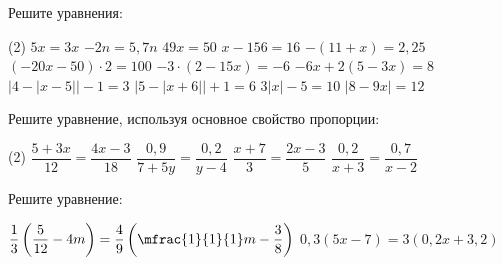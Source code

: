 \begin{homework}[number=1]
	\begin{listofex}
		\item Решите уравнения: %
		\begin{tasks}(2)
			\task \( 5x=3x \)
			\task \( -2n=5,7n \)
			\task \( 49x=50 \)
			\task \( x-156=16 \)
			\task \( -(11+x)=2,25 \)
			\task \( (-20x-50)\cdot 2 = 100 \)
			\task \( -3 \cdot (2-15x) = -6 \)
			\task \( -6x+2(5-3x)=8 \)
			\task \( |4-|x-5||-1=3 \)
			\task \( |5-|x+6||+1=6 \)
			\task \( 3|x|-5=10 \)
			\task \( |8-9x|=12 \)
		\end{tasks}
		\item Решите уравнение, используя основное свойство пропорции:
		\begin{tasks}(2)
			\task \( \dfrac{5+3x}{12} = \dfrac{4x-3}{18} \)
			\task \( \dfrac{0,9}{7+5y} = \dfrac{0,2}{y-4} \)
			\task \( \dfrac{x+7}{3} = \dfrac{2x-3}{5} \)
			\task \( \dfrac{0,2}{x+3} = \dfrac{0,7}{x-2} \)
		\end{tasks}
		\item Решите уравнение: %
		\begin{tasks}
			\task \( \dfrac{1}{3} \left( \dfrac{5}{12}-4m \right) =\dfrac{4}{9} \left(  \mfrac{1}{1}{1} m-\dfrac{3}{8} \right) \)
			\task \( 0,3(5x-7)=3(0,2x+3,2) \)
		\end{tasks}
	\end{listofex}
\end{homework}


